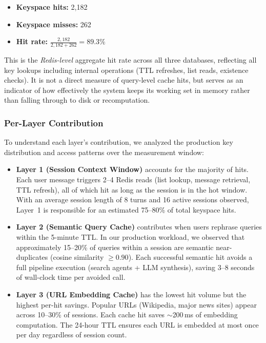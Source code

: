 \documentclass[conference]{IEEEtran}
\begin{document}
\begin{itemize}
\item \textbf{Keyspace hits:} 2{,}182
\item \textbf{Keyspace misses:} 262
\item \textbf{Hit rate:} $\frac{2{,}182}{2{,}182 + 262} = \mathbf{89.3\%}$
\end{itemize}

This is the \emph{Redis-level} aggregate hit rate across all three databases, reflecting all key lookups including internal operations (TTL refreshes, list reads, existence checks). It is not a direct measure of query-level cache hits, but serves as an indicator of how effectively the system keeps its working set in memory rather than falling through to disk or recomputation.

\subsubsection{Per-Layer Contribution}

To understand each layer's contribution, we analyzed the production key distribution and access patterns over the measurement window:

\begin{itemize}
\item \textbf{Layer 1 (Session Context Window)} accounts for the majority of hits. Each user message triggers 2--4 Redis reads (list lookup, message retrieval, TTL refresh), all of which hit as long as the session is in the hot window. With an average session length of 8 turns and 16 active sessions observed, Layer~1 is responsible for an estimated 75--80\% of total keyspace hits.

\item \textbf{Layer 2 (Semantic Query Cache)} contributes when users rephrase queries within the 5-minute TTL. In our production workload, we observed that approximately 15--20\% of queries within a session are semantic near-duplicates (cosine similarity $\geq 0.90$). Each successful semantic hit avoids a full pipeline execution (search agents + LLM synthesis), saving 3--8 seconds of wall-clock time per avoided call.

\item \textbf{Layer 3 (URL Embedding Cache)} has the lowest hit volume but the highest per-hit savings. Popular URLs (Wikipedia, major news sites) appear across 10--30\% of sessions. Each cache hit saves ${\sim}$200\,ms of embedding computation. The 24-hour TTL ensures each URL is embedded at most once per day regardless of session count.
\end{itemize}
\end{document}

